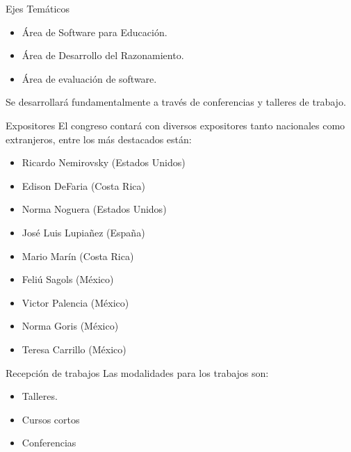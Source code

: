 \documentclass[x11names,table,usenames,dvipsnames]{beamer}
\begin{document}
\begin{frame}[plain]{}
\begin{columns}[t]
\begin{column}{.48\linewidth}
\begin{block}{Ejes Temáticos}
\begin{itemize}
\item Área de Software para Educación.

\item Área de Desarrollo del Razonamiento.

\item Área de evaluación de software.
\end{itemize}

Se desarrollará fundamentalmente a través de conferencias y talleres de trabajo.
        \end{block}
        
        \begin{block}{Expositores}
El congreso contará con diversos expositores tanto nacionales como extranjeros, entre los más destacados están:

\begin{itemize}
\item Ricardo Nemirovsky (Estados Unidos)

\item Edison DeFaria (Costa Rica)

\item Norma Noguera (Estados Unidos)

\item José Luis Lupiañez (España)

\item Mario Marín (Costa Rica)

\item Feliú Sagols (México)

\item Victor Palencia (México)

\item Norma Goris (México)

\item Teresa Carrillo (México)
\end{itemize}
        \end{block}
        
        \begin{block}{Recepción de trabajos}
Las modalidades para los trabajos son:

\begin{itemize}
\item Talleres.

\item Cursos cortos

\item Conferencias
\end{itemize}


\end{block}
\end{column}
\end{columns}
\end{frame}
\end{document}
